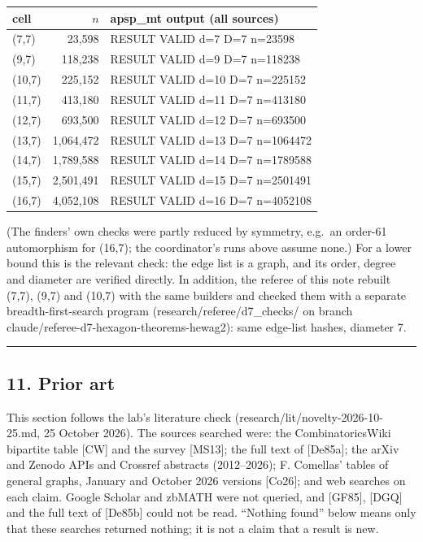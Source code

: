 \documentclass[
  11pt,
]{article}
\begin{document}
\begin{longtable}[]{@{}lrl@{}}
\toprule\noalign{}
cell & \(n\) & apsp\_mt output (all sources) \\
\midrule\noalign{}
\endhead
\bottomrule\noalign{}
\endlastfoot
(7,7) & 23,598 & RESULT VALID d=7 D=7 n=23598 \\
(9,7) & 118,238 & RESULT VALID d=9 D=7 n=118238 \\
(10,7) & 225,152 & RESULT VALID d=10 D=7 n=225152 \\
(11,7) & 413,180 & RESULT VALID d=11 D=7 n=413180 \\
(12,7) & 693,500 & RESULT VALID d=12 D=7 n=693500 \\
(13,7) & 1,064,472 & RESULT VALID d=13 D=7 n=1064472 \\
(14,7) & 1,789,588 & RESULT VALID d=14 D=7 n=1789588 \\
(15,7) & 2,501,491 & RESULT VALID d=15 D=7 n=2501491 \\
(16,7) & 4,052,108 & RESULT VALID d=16 D=7 n=4052108 \\
\end{longtable}

(The finders' own checks were partly reduced by symmetry, e.g.~an order-61 automorphism for (16,7); the coordinator's
runs above assume none.) For a lower bound this is the relevant check: the edge list is a graph, and its order, degree
and diameter are verified directly. In addition, the referee of this note rebuilt (7,7), (9,7) and (10,7) with the same
builders and checked them with a separate breadth-first-search program (research/referee/d7\_checks/ on branch
claude/referee-d7-hexagon-theorems-hewag2): same edge-list hashes, diameter 7.

\begin{center}\rule{0.5\linewidth}{0.5pt}\end{center}

\hypertarget{prior-art}{%
\subsection{11. Prior art}\label{prior-art}}

This section follows the lab's literature check (research/lit/novelty-2026-10-25.md, 25 October 2026). The sources
searched were: the CombinatoricsWiki bipartite table {[}CW{]} and the survey {[}MS13{]}; the full text of {[}De85a{]};
the arXiv and Zenodo APIs and Crossref abstracts (2012--2026); F. Comellas' tables of general graphs, January and
October 2026 versions {[}Co26{]}; and web searches on each claim. Google Scholar and zbMATH were not queried, and
{[}GF85{]}, {[}DGQ{]} and the full text of {[}De85b{]} could not be read. ``Nothing found'' below means only that these
searches returned nothing; it is not a claim that a result is new.
\end{document}

